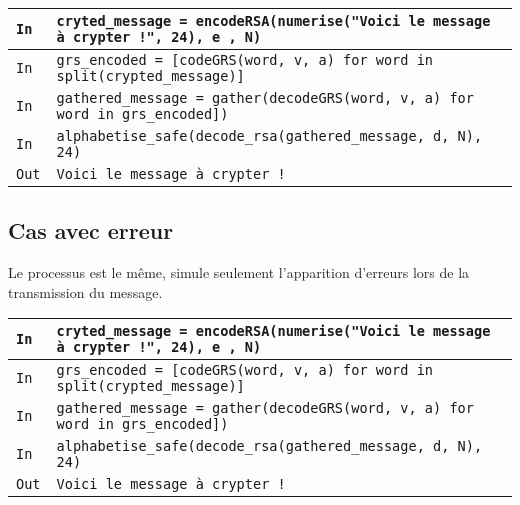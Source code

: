 \documentclass[titlepage]{article}
\begin{document}
        \begin{tabularx}{12cm}{|p{0.60cm}|X|}
            \hline
            \rowcolor{gray}
            \texttt{In}
            & 
            \texttt{cryted\_message = encodeRSA(numerise("Voici le message à crypter !", 24), e , N)}
            \\
            \hline
            \rowcolor{gray}
            \texttt{In}
            &
            \texttt{grs\_encoded = [codeGRS(word, v, a) for word in split(crypted\_message)]}
            \\
            \hline
            \rowcolor{gray}
            \texttt{In}
            &
            \texttt{gathered\_message = gather(decodeGRS(word, v, a) for word in grs\_encoded])}
            \\
            \hline
            \rowcolor{gray}
            \texttt{In}
            &
            \texttt{alphabetise\_safe(decode\_rsa(gathered\_message, d, N), 24)}
            \\
            \hline
            \texttt{Out}
            &
            \texttt{Voici le message à crypter !}
            \\
            \hline
        \end{tabularx}
        \bigbreak
    
    \subsection{Cas avec erreur}

        Le processus est le même, simule seulement l'apparition d'erreurs lors de la transmission du message.

        \begin{tabularx}{12cm}{|p{0.60cm}|X|}
            \hline
            \rowcolor{gray}
            \texttt{In}
            & 
            \texttt{cryted\_message = encodeRSA(numerise("Voici le message à crypter !", 24), e , N)}
            \\
            \hline
            \rowcolor{gray}
            \texttt{In}
            &
            \texttt{grs\_encoded = [codeGRS(word, v, a) for word in split(crypted\_message)]}
            \\
            \hline
            \rowcolor{gray}
            \texttt{In}
            &
            \texttt{gathered\_message = gather(decodeGRS(word, v, a) for word in grs\_encoded])}
            \\
            \hline
            \rowcolor{gray}
            \texttt{In}
            &
            \texttt{alphabetise\_safe(decode\_rsa(gathered\_message, d, N), 24)}
            \\
            \hline
            \texttt{Out}
            &
            \texttt{Voici le message à crypter !}
            \\
            \hline
        \end{tabularx}
        \bigbreak
        
\end{document}
